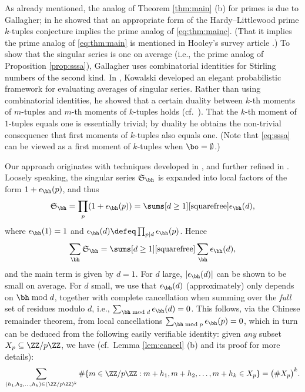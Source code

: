 \documentclass[12pt, reqno, twoside, letterpaper]{amsart}
\begin{document}
As already mentioned, the analog of Theorem \ref{thm:main} (b) for 
primes is due to Gallagher; in \cite{GAL:76} he showed that an 
appropriate form of the Hardy--Littlewood prime $k$-tuples 
conjecture implies the prime analog of \eqref{eq:thm:mainc}.
%
(That it implies the prime analog of \eqref{eq:thm:main} is 
mentioned in Hooley's survey article \cite[p.\ 137]{HOO:72}.)
%
To show that the singular series is one on average (i.e., the 
prime analog of Proposition \ref{prop:sssa}), Gallagher uses 
combinatorial identities for Stirling numbers of the second kind.
%
In \cite{KOW:11}, Kowalski developed an elegant probabilistic
framework for evaluating averages of singular series.  
%
Rather than using combinatorial identities, he showed that a 
certain duality between $k$-th moments of $m$-tuples and 
$m$-th moments of $k$-tuples holds 
(cf.\ \cite[Theorem 1]{KOW:11}).  
%
That the $k$-th moment of $1$-tuples equals one is essentially 
trivial; by duality he obtains the non-trivial consequence that 
first moments of $k$-tuples also equals one.
%
(Note that \eqref{eq:sssa} can be viewed as a first moment of 
$k$-tuples when $\bo = \emptyset$.)  

Our approach originates with techniques developed in
\cite{KR:99, KUR:00}, and further refined in \cite{GK:08, KUR:09}.
%
Loosely speaking, the singular series $\mathfrak{S}_{\bh}$ is 
expanded into local factors of the form $1 + \epsilon_{\bh}(p)$,
and thus
\[
 \mathfrak{S}_{\bh} = \prod_{p} (1 + \epsilon_{\bh}(p))
 =
  \sums[d \ge 1][\text{squarefree}] \epsilon_{\bh}(d),
\]
where $\epsilon_{\bh}(1) = 1$ and 
$\epsilon_{\bh}(d) \defeq \prod_{p|d} \epsilon_{\bh}(p)$.  
%
Hence
\[
 \sum_{\bh}
  \mathfrak{S}_{\bh} 
   =
    \sums[d \ge 1][\text{squarefree}]
     \sum_{\bh}
      \epsilon_{\bh}(d),
\]
and the main term is given by $d = 1$.  
%
For $d$ large, $|\epsilon_{\bh}(d)|$ can be shown to be small on 
average.
%
For $d$ small, we use that $\epsilon_{\bh}(d)$ (approximately) 
only depends on $\bh \bmod d$, together with complete cancellation 
when summing over the {\em full} set of residues modulo $d$, i.e.,
$\sum_{\bh \bmod d} \epsilon_{\bh}(d) = 0$.  
%
This follows, via the Chinese remainder theorem, from local
cancellations
$ 
\sum_{\bh \bmod p} \epsilon_{\bh}(p) = 0
$, 
which in turn can be deduced from the following easily verifiable
identity: given {\em any} subset $X_p \subseteq \ZZ/p\ZZ$, we have
(cf.\ Lemma \ref{lem:cancel} (b) and its proof for more details):
\[
 \sum_{(h_1, h_2, \ldots, h_k) \in (\ZZ/p\ZZ)^k} 
  \#\{ m \in \ZZ/p\ZZ : m + h_1, m + h_2, \ldots, m + h_k \in X_p\}
   =
    \big(\#X_p\big)^{k}.
\]
\end{document}
